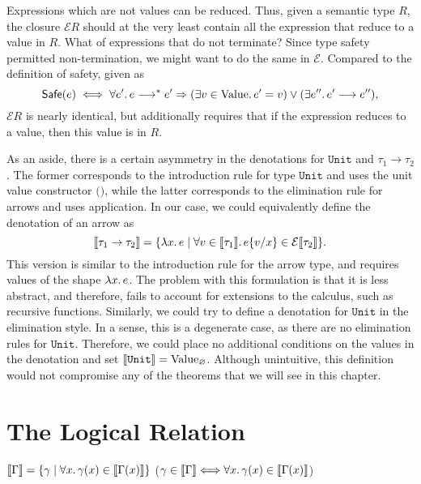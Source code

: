 Expressions which are not values can be reduced.
Thus, given a semantic type $R$, the closure $\mathcal{E} R$
should at the very least contain all the expression that reduce
to a value in $R$. What of expressions that do not terminate? Since
type safety permitted non-termination, we might want to do the same in
$\mathcal{E}$.
Compared to the definition of safety, given as
\[
  \mathsf{Safe}(e) \iff
  \forall e'\ldotp e \longrightarrow^* e'
    \Rightarrow (\exists v \in \mathrm{Value}\ldotp e'=v) \lor
      (\exists e'' \ldotp e'\longrightarrow e''),
\]
$\mathcal{E} R$ is nearly identical, but additionally requires that if the
expression reduces to a value, then this value is in $R$.

As an aside, there is a certain asymmetry in the denotations for
$\texttt{Unit}$ and $\tau_1\to\tau_2$. The former corresponds to the
introduction rule for type $\texttt{Unit}$ and uses the unit value constructor
$\texttt{()}$, while the latter corresponds to the elimination rule for
arrows and uses application.
In our case, we could equivalently define the denotation of an arrow as
\[
  \llbracket\tau_1 \to \tau_2\rrbracket = \{ \lambda x\ldotp e \mid
  \forall v \in \llbracket\tau_1\rrbracket\ldotp
    e\{v/x\} \in \mathcal{E}\llbracket\tau_2\rrbracket \}.
\]
This version is similar to the introduction rule for the arrow type, and
requires values of the shape $\lambda x\ldotp e$. The problem with this
formulation is that it is less abstract, and therefore, fails to account for
extensions to the calculus, such as recursive functions. Similarly, we could
try to define a denotation for $\texttt{Unit}$ in the elimination style.
In a sense, this is a degenerate case, as there are no elimination rules for
$\texttt{Unit}$. Therefore, we could place no additional conditions on the
values in the denotation and set
$\llbracket\texttt{Unit}\rrbracket = \mathrm{Value}_{\varnothing}$. Although
unintuitive, this definition would not compromise any of the theorems
that we will see in this chapter.

\section{The Logical Relation}


$\llbracket\Gamma\rrbracket = \{\gamma \mid \forall x\ldotp \gamma(x) \in \llbracket\Gamma(x)\rrbracket\}$
($\gamma \in \llbracket\Gamma\rrbracket \Longleftrightarrow \forall x\ldotp \gamma(x) \in \llbracket\Gamma(x)\rrbracket $)

